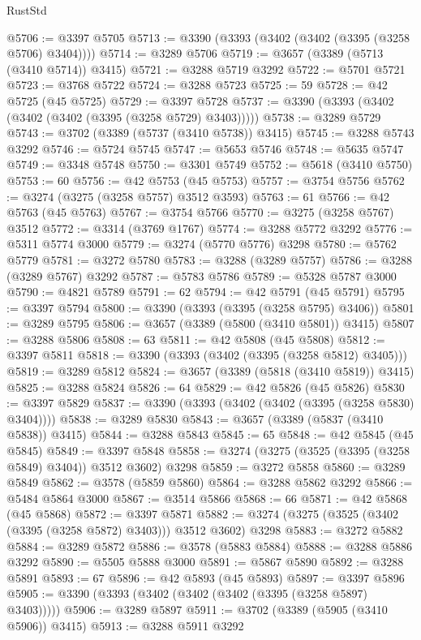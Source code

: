 \begin{lexlean}{RustStd}
\begin{coremodule}
@5706 := @3397 @5705
@5713 := @3390 (@3393 (@3402 (@3402 (@3395 (@3258 @5706) @3404))))
@5714 := @3289 @5706
@5719 := @3657 (@3389 (@5713 (@3410 @5714)) @3415)
@5721 := @3288 @5719 @3292
@5722 := @5701 @5721
@5723 := @3768 @5722
@5724 := @3288 @5723
@5725 := 59
@5728 := @42 @5725 (@45 @5725)
@5729 := @3397 @5728
@5737 := @3390 (@3393 (@3402 (@3402 (@3402 (@3395 (@3258 @5729) @3403)))))
@5738 := @3289 @5729
@5743 := @3702 (@3389 (@5737 (@3410 @5738)) @3415)
@5745 := @3288 @5743 @3292
@5746 := @5724 @5745
@5747 := @5653 @5746
@5748 := @5635 @5747
@5749 := @3348 @5748
@5750 := @3301 @5749
@5752 := @5618 (@3410 @5750)
@5753 := 60
@5756 := @42 @5753 (@45 @5753)
@5757 := @3754 @5756
@5762 := @3274 (@3275 (@3258 @5757) @3512 @3593)
@5763 := 61
@5766 := @42 @5763 (@45 @5763)
@5767 := @3754 @5766
@5770 := @3275 (@3258 @5767) @3512
@5772 := @3314 (@3769 @1767)
@5774 := @3288 @5772 @3292
@5776 := @5311 @5774 @3000
@5779 := @3274 (@5770 @5776) @3298
@5780 := @5762 @5779
@5781 := @3272 @5780
@5783 := @3288 (@3289 @5757)
@5786 := @3288 (@3289 @5767) @3292
@5787 := @5783 @5786
@5789 := @5328 @5787 @3000
@5790 := @4821 @5789
@5791 := 62
@5794 := @42 @5791 (@45 @5791)
@5795 := @3397 @5794
@5800 := @3390 (@3393 (@3395 (@3258 @5795) @3406))
@5801 := @3289 @5795
@5806 := @3657 (@3389 (@5800 (@3410 @5801)) @3415)
@5807 := @3288 @5806
@5808 := 63
@5811 := @42 @5808 (@45 @5808)
@5812 := @3397 @5811
@5818 := @3390 (@3393 (@3402 (@3395 (@3258 @5812) @3405)))
@5819 := @3289 @5812
@5824 := @3657 (@3389 (@5818 (@3410 @5819)) @3415)
@5825 := @3288 @5824
@5826 := 64
@5829 := @42 @5826 (@45 @5826)
@5830 := @3397 @5829
@5837 := @3390 (@3393 (@3402 (@3402 (@3395 (@3258 @5830) @3404))))
@5838 := @3289 @5830
@5843 := @3657 (@3389 (@5837 (@3410 @5838)) @3415)
@5844 := @3288 @5843
@5845 := 65
@5848 := @42 @5845 (@45 @5845)
@5849 := @3397 @5848
@5858 := @3274 (@3275 (@3525 (@3395 (@3258 @5849) @3404)) @3512 @3602) @3298
@5859 := @3272 @5858
@5860 := @3289 @5849
@5862 := @3578 (@5859 @5860)
@5864 := @3288 @5862 @3292
@5866 := @5484 @5864 @3000
@5867 := @3514 @5866
@5868 := 66
@5871 := @42 @5868 (@45 @5868)
@5872 := @3397 @5871
@5882 := @3274 (@3275 (@3525 (@3402 (@3395 (@3258 @5872) @3403))) @3512 @3602) @3298
@5883 := @3272 @5882
@5884 := @3289 @5872
@5886 := @3578 (@5883 @5884)
@5888 := @3288 @5886 @3292
@5890 := @5505 @5888 @3000
@5891 := @5867 @5890
@5892 := @3288 @5891
@5893 := 67
@5896 := @42 @5893 (@45 @5893)
@5897 := @3397 @5896
@5905 := @3390 (@3393 (@3402 (@3402 (@3402 (@3395 (@3258 @5897) @3403)))))
@5906 := @3289 @5897
@5911 := @3702 (@3389 (@5905 (@3410 @5906)) @3415)
@5913 := @3288 @5911 @3292

\end{coremodule}
\end{lexlean}
